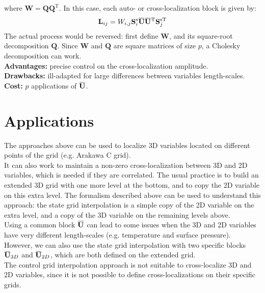 \documentclass[12pt]{scrartcl}
\newcommand{\overbar}[1]{\mkern 1.5mu\overline{\mkern-1.5mu#1\mkern-1.5mu}\mkern 1.5mu}
\begin{document}
where $\mathbf{W} = \mathbf{Q} \mathbf{Q}^\textrm{T}$. In this case, each auto- or cross-localization block is given by: 
\begin{align}
\mathbf{L}_{ij} = W_{i,j} \mathbf{S}^\mathrm{s}_i \overbar{\mathbf{U}} \overbar{\mathbf{U}}^\mathrm{T} \mathbf{S}_j^{\mathrm{s} \mathrm{T}}
\end{align}
The actual process would be reversed: first define $\mathbf{W}$, and its square-root decomposition $\mathbf{Q}$. Since $\mathbf{W}$ and $\mathbf{Q}$ are square matrices of size $p$, a Cholesky decomposition can work.\\
$  $\\
\textbf{Advantages:} precise control on the cross-localization amplitude.\\
\textbf{Drawbacks:} ill-adapted for large differences between variables length-scales.\\
\textbf{Cost:} $p$ applications of $\overbar{\mathbf{U}}$.

\section{Applications}
The approaches above can be used to localize 3D variables located on different points of the grid (e.g. Arakawa C grid).\\
$  $\\
It can also work to maintain a non-zero cross-localization between 3D and 2D variables, which is needed if they are correlated. The usual practice is to build an extended 3D grid with one more level at the bottom, and to copy the 2D variable on this extra level. The formalism described above can be used to understand this approach: the state grid interpolation is a simple copy of the 2D variable on the extra level, and a copy of the 3D variable on the remaining levels above.\\
$  $\\
Using a common block $\overbar{\mathbf{U}}$ can lead to some issues when the 3D and 2D variables have very different length-scales (e.g. temperature and surface pressure). However, we can also use the state grid interpolation with two specific blocks $\overbar{\mathbf{U}}_{3D}$ and $\overbar{\mathbf{U}}_{2D}$, which are both defined on the extended grid.\\
$  $\\
The control grid interpolation approach is not suitable to cross-localize 3D and 2D variables, since it is not possible to define cross-localizations on their specific grids.

\clearpage



\end{document}
